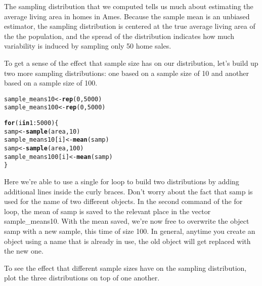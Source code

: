 \documentclass{article}\usepackage[]{graphicx}\usepackage[]{color}
\makeatletter
\newcommand{\hlnum}[1]{\textcolor[rgb]{0.686,0.059,0.569}{#1}}%
\newcommand{\hlopt}[1]{\textcolor[rgb]{0,0,0}{#1}}%
\newcommand{\hlstd}[1]{\textcolor[rgb]{0.345,0.345,0.345}{#1}}%
\newcommand{\hlkwa}[1]{\textcolor[rgb]{0.161,0.373,0.58}{\textbf{#1}}}%
\newcommand{\hlkwb}[1]{\textcolor[rgb]{0.69,0.353,0.396}{#1}}%
\newcommand{\hlkwd}[1]{\textcolor[rgb]{0.737,0.353,0.396}{\textbf{#1}}}%
\newenvironment{kframe}{%
 \def\at@end@of@kframe{}%
 \ifinner\ifhmode%
  \def\at@end@of@kframe{\end{minipage}}%
  \begin{minipage}{\columnwidth}%
 \fi\fi%
 \def\FrameCommand##1{\hskip\@totalleftmargin \hskip-\fboxsep
 \colorbox{shadecolor}{##1}\hskip-\fboxsep
     \hskip-\linewidth \hskip-\@totalleftmargin \hskip\columnwidth}%
 \MakeFramed {\advance\hsize-\width
   \@totalleftmargin\z@ \linewidth\hsize
   \@setminipage}}%
 {\par\unskip\endMakeFramed%
 \at@end@of@kframe}
\newenvironment{knitrout}{}{} %
\makeatother
\begin{document}
The sampling distribution that we computed tells us much about estimating the average living area in homes in Ames.  Because the sample mean is an unbiased estimator, the sampling distribution is centered at the true average living area of the the population, and the spread of the distribution indicates how much variability is induced by sampling only 50 home sales.

To get a sense of the effect that sample size has on our distribution, let's build up two more sampling distributions: one based on a sample size of 10 and another based on a sample size of 100.

\begin{knitrout}
\color{fgcolor}\begin{kframe}
\begin{alltt}
\hlstd{sample_means10} \hlkwb{<-} \hlkwd{rep}\hlstd{(}\hlnum{0}\hlstd{,} \hlnum{5000}\hlstd{)}
\hlstd{sample_means100} \hlkwb{<-} \hlkwd{rep}\hlstd{(}\hlnum{0}\hlstd{,} \hlnum{5000}\hlstd{)}

\hlkwa{for} \hlstd{(i} \hlkwa{in} \hlnum{1}\hlopt{:}\hlnum{5000}\hlstd{) \{}
    \hlstd{samp} \hlkwb{<-} \hlkwd{sample}\hlstd{(area,} \hlnum{10}\hlstd{)}
    \hlstd{sample_means10[i]} \hlkwb{<-} \hlkwd{mean}\hlstd{(samp)}
    \hlstd{samp} \hlkwb{<-} \hlkwd{sample}\hlstd{(area,} \hlnum{100}\hlstd{)}
    \hlstd{sample_means100[i]} \hlkwb{<-} \hlkwd{mean}\hlstd{(samp)}
\hlstd{\}}
\end{alltt}
\end{kframe}
\end{knitrout}


Here we're able to use a single for loop to build two distributions by adding additional lines inside the curly braces.  Don't worry about the fact that \hlstd{samp} is used for the name of two different objects.  In the second command of the for loop, the mean of \hlstd{samp} is saved to the relevant place in the vector \hlstd{sample\_means10}.  With the mean saved, we're now free to overwrite the object \hlstd{samp} with a new sample, this time of size 100.  In general, anytime you create an object using a name that is already in use, the old object will get replaced with the new one.

To see the effect that different sample sizes have on the sampling distribution, plot the three distributions on top of one another.
\end{document}
